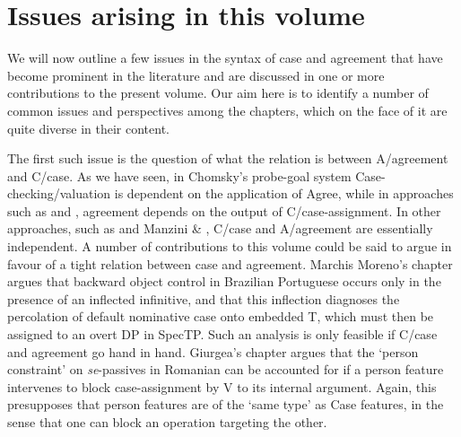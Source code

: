 \documentclass[output=paper]{langsci/langscibook}
\begin{document}
\section{Issues arising in this volume}

We will now outline a few issues in the syntax of case and agreement that have become prominent in the literature and are discussed in one or more contributions to the present volume. Our aim here is to identify a number of common issues and perspectives among the chapters, which on the face of it are quite diverse in their content.

The first such issue is the question of what the relation is between A/agreement and C/case. As we have seen, in Chomsky’s probe-goal system Case-checking/valuation is dependent on the application of Agree, while in approaches such as \citet{Bobaljik2008} and \citet{Preminger2014}, agreement depends on the output of C/case-assignment. In other approaches, such as \citet{Baker2015} and Manzini \& \citet{Franco2016}, C/case and A/agreement are essentially independent. A number of contributions to this volume could be said to argue in favour of a tight relation between case and agreement. Marchis Moreno’s chapter argues that backward object control in Brazilian Portuguese occurs only in the presence of an inflected infinitive, and that this inflection diagnoses the percolation of default nominative case onto embedded T, which must then be assigned to an overt DP in SpecTP. Such an analysis is only feasible if C/case and agreement go hand in hand. Giurgea’s chapter argues that the ‘person constraint’ on \textit{se}{}-passives in Romanian can be accounted for if a person feature intervenes to block case-assignment by V to its internal argument. Again, this presupposes that person features are of the ‘same type’ as Case features, in the sense that one can block an operation targeting the other.
\end{document}
